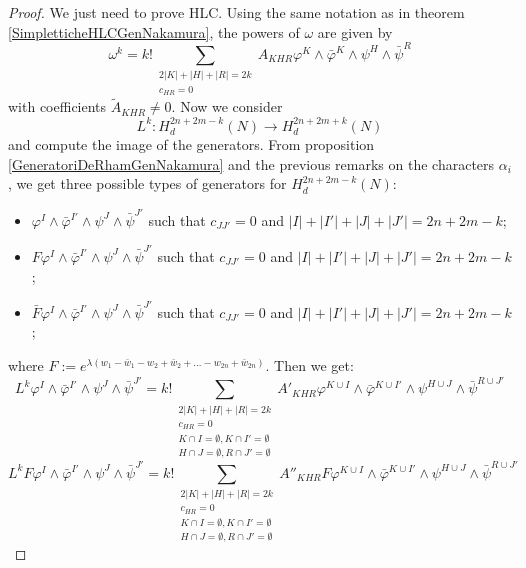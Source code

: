 \documentclass[a4paper, 11pt]{amsart}
\theoremstyle{plain}
\theoremstyle{definition}
\numberwithin{equation}{section}
\begin{document}
\begin{proof}
    We just need to prove HLC. Using the same notation as in theorem \ref{SimpletticheHLCGenNakamura}, the powers of $\omega$ are given by
    \[\omega^{k} = k! \sum_{\substack{2|K| + |H| + |R| = 2k \\ c_{HR} = 0}} A_{KHR}\varphi^{K} \wedge \bar\varphi^{K} \wedge \psi^{H} \wedge \bar\psi^{R}\]
    with coefficients $\tilde{A}_{KHR} \ne 0$. Now we consider
    \[L^{k}: H^{2n+2m-k}_{d}(N) \rightarrow H^{2n+2m+k}_{d}(N)\]
    and compute the image of the generators. From proposition \ref{GeneratoriDeRhamGenNakamura} and the previous remarks on the characters $\alpha_{i}$, we get three possible types of generators for $H^{2n+2m-k}_{d}(N)$:\\[5pt]
    \begin{itemize}
        \item $\varphi^{I} \wedge \bar\varphi^{I'} \wedge \psi^{J} \wedge \bar\psi^{J'}$ such that $c_{JJ'} = 0$ and $|I| + |I'| + |J| + |J'| = 2n+2m-k$;\\[5pt]
        \item $F\varphi^{I} \wedge \bar\varphi^{I'} \wedge \psi^{J} \wedge \bar\psi^{J'}$ such that $c_{JJ'} = 0$ and $|I| + |I'| + |J| + |J'| = 2n+2m-k$;\\[5pt]
        \item $\bar F\varphi^{I} \wedge \bar\varphi^{I'} \wedge \psi^{J} \wedge \bar\psi^{J'}$ such that $c_{JJ'} = 0$ and $|I| + |I'| + |J| + |J'| = 2n+2m-k$;\\[5pt]
    \end{itemize}
    where $F := e^{\lambda(w_{1} - \bar w_{1} - w_{2} + \bar w_{2} + \ldots -w_{2n} + \bar w_{2n})}$. Then we get:\\
    \[L^{k}\varphi^{I} \wedge \bar\varphi^{I'} \wedge \psi^{J} \wedge \bar\psi^{J'} = k!\sum_{\substack{2|K| + |H| + |R| = 2k \\ c_{HR} = 0 \\ K \cap I = \emptyset, K \cap I' = \emptyset \\ H \cap J = \emptyset, R \cap J' = \emptyset}} A'_{KHR}\varphi^{K \cup I} \wedge \bar\varphi^{K \cup I'} \wedge \psi^{H \cup J} \wedge \bar\psi^{R \cup J'}\]
    \[L^{k}F\varphi^{I} \wedge \bar\varphi^{I'} \wedge \psi^{J} \wedge \bar\psi^{J'} = k!\sum_{\substack{2|K| + |H| + |R| = 2k \\ c_{HR} = 0 \\ K \cap I = \emptyset, K \cap I' = \emptyset \\ H \cap J = \emptyset, R \cap J' = \emptyset}} A''_{KHR}F\varphi^{K \cup I} \wedge \bar\varphi^{K \cup I'} \wedge \psi^{H \cup J} \wedge \bar\psi^{R \cup J'}\]

\end{proof}
\end{document}
